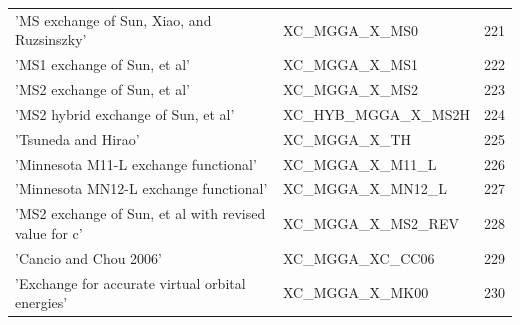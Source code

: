 \documentclass[final,12pt,makeidx,DIV=calc]{article}
\begin{document}
{{{\begin{table}[!h]
\begin{center}
\begin{tabular}{llr}
  'MS exchange of Sun, Xiao, and Ruzsinszky' & XC\_MGGA\_X\_MS0  &221\\
  'MS1 exchange of Sun, et al' & XC\_MGGA\_X\_MS1  &222\\
  'MS2 exchange of Sun, et al' & XC\_MGGA\_X\_MS2  &223\\
  'MS2 hybrid exchange of Sun, et al' & XC\_HYB\_MGGA\_X\_MS2H  &224\\
  'Tsuneda and Hirao' & XC\_MGGA\_X\_TH  &225\\
  'Minnesota M11-L exchange functional' & XC\_MGGA\_X\_M11\_L  &226\\
  'Minnesota MN12-L exchange functional' & XC\_MGGA\_X\_MN12\_L  &227\\
  'MS2 exchange of Sun, et al with revised value for c' & XC\_MGGA\_X\_MS2\_REV  &228\\
  'Cancio and Chou 2006' & XC\_MGGA\_XC\_CC06  &229\\
  'Exchange for accurate virtual orbital energies' & XC\_MGGA\_X\_MK00  &230\\
\end{tabular}
\end{center}
\end{table}

}}}
\end{document}

